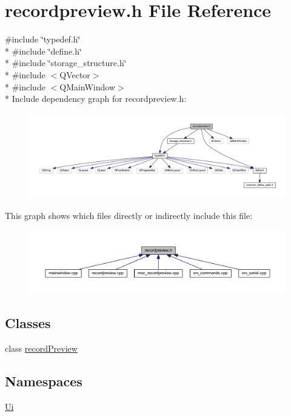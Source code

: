 \hypertarget{a00043}{\section{recordpreview.\+h File Reference}
\label{a00043}
}
{\ttfamily \#include \char`\"{}typedef.\+h\char`\"{}}\\*
{\ttfamily \#include \char`\"{}define.\+h\char`\"{}}\\*
{\ttfamily \#include \char`\"{}storage\+\_\+structure.\+h\char`\"{}}\\*
{\ttfamily \#include $<$Q\+Vector$>$}\\*
{\ttfamily \#include $<$Q\+Main\+Window$>$}\\*
Include dependency graph for recordpreview.\+h\+:
\nopagebreak
\begin{figure}[H]
\begin{center}
\leavevmode
\includegraphics[width=350pt]{de/db1/a00197}
\end{center}
\end{figure}
This graph shows which files directly or indirectly include this file\+:
\nopagebreak
\begin{figure}[H]
\begin{center}
\leavevmode
\includegraphics[width=350pt]{d7/da0/a00198}
\end{center}
\end{figure}
\subsection*{Classes}
\begin{DoxyCompactItemize}
\item 
class \hyperlink{a00020}{record\+Preview}
\end{DoxyCompactItemize}
\subsection*{Namespaces}
\begin{DoxyCompactItemize}
\item 
 \hyperlink{a00055}{Ui}
\end{DoxyCompactItemize}

